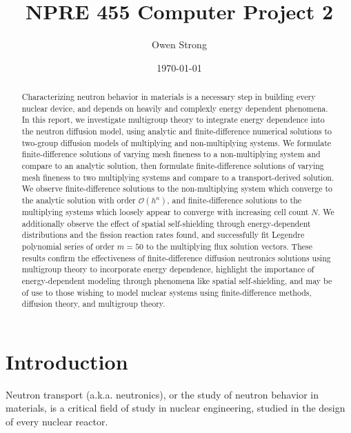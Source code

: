 \documentclass[11pt]{article} %
\title{NPRE 455 Computer Project 2}
\author{Owen Strong}
\date{\today}
\newcommand{\bigO}{\mathcal{O}}
\begin{document}
\maketitle
\clearpage

\tableofcontents
\clearpage

\listoffigures
\listoftables
\clearpage
{}

\begin{abstract}
    Characterizing neutron behavior in materials is a necessary step in building every nuclear device, and depends on heavily and complexly energy dependent phenomena.
    In this report, we investigate multigroup theory to integrate energy dependence into the neutron diffusion model, using analytic and finite-difference numerical solutions to two-group diffusion models of multiplying and non-multiplying systems.
    We formulate finite-difference solutions of varying mesh fineness to a non-multiplying system and compare to an analytic solution, then formulate finite-difference solutions of varying mesh fineness to two multiplying systems and compare to a transport-derived solution.
    We observe finite-difference solutions to the non-multiplying system which converge to the analytic solution with order $\bigO(h^n)$, and finite-difference solutions to the multiplying systems which loosely appear to converge with increasing cell count $N$.
    We additionally observe the effect of spatial self-shielding through energy-dependent distributions and the fission reaction rates found, and successfully fit Legendre polynomial series of order $m=50$ to the multiplying flux solution vectors.
    These results confirm the effectiveness of finite-difference diffusion neutronics solutions using multigroup theory to incorporate energy dependence, highlight the importance of energy-dependent modeling through phenomena like spatial self-shielding, and may be of use to those wishing to model nuclear systems using finite-difference methods, diffusion theory, and multigroup theory.
\end{abstract}

\section{Introduction}\label{sec:introduction}

Neutron transport (a.k.a. neutronics), or the study of neutron behavior in materials, is a critical field of study in nuclear engineering, studied in the design of every nuclear reactor.\\
\end{document}
